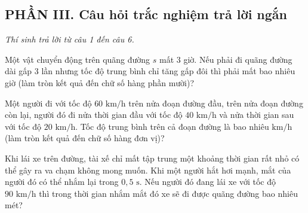\setcounter{ex}{0}
\subsection*{PHẦN III. Câu hỏi trắc nghiệm trả lời ngắn}
\textit{Thí sinh trả lời từ câu 1 đến câu 6.}

\begin{ex} Một vật chuyển động trên quãng đường $s$ mất 3 giờ. Nếu phải đi quãng đường dài gấp 3 lần nhưng tốc độ trung bình chỉ tăng gấp đôi thì phải mất bao nhiêu giờ (làm tròn kết quả đến chữ số hàng phần mười)?

\par{}
\end{ex}

\begin{ex} Một người đi với tốc độ $60\text{ km/h}$ trên nửa đoạn đường đầu, trên nửa đoạn đường còn lại, người đó đi nửa thời gian đầu với tốc độ $40\text{ km/h}$ và nửa thời gian sau với tốc độ $20\text{ km/h}$. Tốc độ trung bình trên cả đoạn đường là bao nhiêu $\text{km/h}$ (làm tròn kết quả đến chữ số hàng đơn vị)?

\par{}
\end{ex}

\begin{ex} Khi lái xe trên đường, tài xế chỉ mất tập trung một khoảng thời gian rất nhỏ có thể gây ra va chạm không mong muốn. Khi một người hắt hơi mạnh, mắt của người đó có thể nhắm lại trong $0{,}5\text{ s}$. Nếu người đó đang lái xe với tốc độ $90\text{ km/h}$ thì trong thời gian nhắm mắt đó xe sẽ đi được quãng đường bao nhiêu mét?

\par{}
\end{ex}

